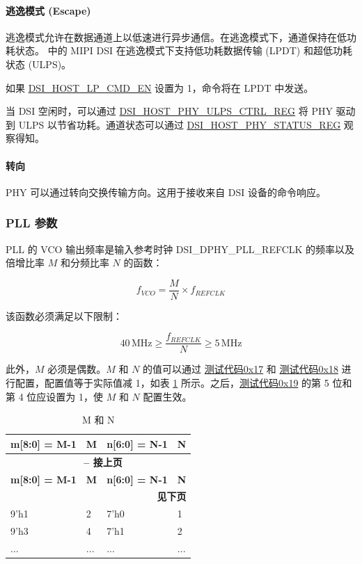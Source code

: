 \documentclass[main\_\_CN.tex]{subfiles}
\begin{document}
\paragraph{逃逸模式 (Escape)}
逃逸模式允许在数据通道上以低速进行异步通信。在逃逸模式下，通道保持在低功耗状态。 \chipname{} 中的 MIPI DSI 在逃逸模式下支持低功耗数据传输 (LPDT) 和超低功耗状态 (ULPS)。

如果 \hyperref[fielddesc:DSIHOSTLPCMDEN]{DSI\_HOST\_LP\_CMD\_EN} 设置为 1，命令将在 LPDT 中发送。

当 DSI 空闲时，可以通过 \hyperref[regdesc:DSIHOSTPHYULPSCTRLREG]{DSI\_HOST\_PHY\_ULPS\_CTRL\_REG} 将 PHY 驱动到 ULPS 以节省功耗。通道状态可以通过 \hyperref[regdesc:DSIHOSTPHYSTATUSREG]{DSI\_HOST\_PHY\_STATUS\_REG} 观察得知。

\paragraph{转向}
PHY 可以通过转向交换传输方向。这用于接收来自 DSI 设备的命令响应。

\subsubsection{PLL 参数}
\label{sec:pll-parameters}
PLL 的 VCO 输出频率是输入参考时钟 DSI\_DPHY\_PLL\_REFCLK 的频率以及倍增比率 $M$ 和分频比率 $N$ 的函数：

\[
f_{VCO} = \frac{M}{N} \times f_{REFCLK}
\]

该函数必须满足以下限制：

\[
40\,\mathrm{MHz} \geq \frac{f_{REFCLK}}{N} \geq 5\,\mathrm{MHz}
\]

此外，$M$ 必须是偶数。$M$ 和 $N$ 的值可以通过 \hyperref[sec:test-code-0x17]{测试代码0x17} 和 \hyperref[sec:test-code-0x18]{测试代码0x18} 进行配置，配置值等于实际值减 1，如表 \ref{tab:m-n-ratios} 所示。之后，\hyperref[sec:test-code-0x19]{测试代码0x19} 的第 5 位和第 4 位应设置为 1，使 $M$ 和 $N$ 配置生效。

\begin{longtable}{|p{3cm}|p{2cm}|p{3cm}|p{2cm}|}
    \caption{M 和 N} \label{tab:m-n-ratios} \\
    \hline
    \rowcolor{lightgray}
    \textbf{m[8:0] = M-1} & \textbf{M} & \textbf{n[6:0] = N-1} & \textbf{N} \\ \hline
    \endfirsthead

    \multicolumn{4}{c}{\bfseries \tablename\ \thetable{} -- 接上页}\\\hline
    \rowcolor{lightgray}
    \textbf{m[8:0] = M-1} & \textbf{M} & \textbf{n[6:0] = N-1} & \textbf{N} \\ \hline
    \endhead

    \multicolumn{4}{r}{\textbf{见下页}} \\
    \endfoot

    \endlastfoot
    
    9'h1 & 2 & 7'h0 & 1  \\ \hline
    9'h3 & 4 & 7'h1 & 2  \\ \hline
    ... & ... & ... & ...  \\ \hline
\end{longtable}
\end{document}
